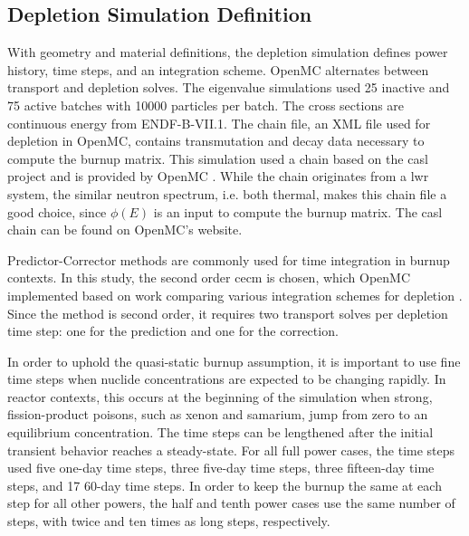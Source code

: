 \documentclass[letterpaper]{physor2024}
\begin{document}
\subsection{Depletion Simulation Definition}\label{sec:depl_sim}
With geometry and material definitions, the depletion simulation defines power history, time steps, and an integration scheme. OpenMC alternates between transport and depletion solves. The eigenvalue simulations used 25 inactive and 75 active batches with 10000 particles per batch. The cross sections are continuous energy from ENDF-B-VII.1. The chain file, an XML file used for depletion in OpenMC, contains transmutation and decay data necessary to compute the burnup matrix. This simulation used a chain based on the \gls{casl} project \cite{CASL-report} and is provided by OpenMC \cite{openmc-chains}. While the chain originates from a \gls{lwr} system, the similar neutron spectrum, i.e. both thermal, makes this chain file a good choice, since $\phi(E)$ is an input to compute the burnup matrix. The \gls{casl} chain can be found on OpenMC's website.

Predictor-Corrector methods are commonly used for time integration in burnup contexts. In this study, the second order \gls{cecm} is chosen, which OpenMC implemented based on work comparing various integration schemes for depletion \cite{isotalo_comparison_2015}. Since the method is second order, it requires two transport solves per depletion time step: one for the prediction and one for the correction.

In order to uphold the quasi-static burnup assumption, it is important to use fine time steps when nuclide concentrations are expected to be changing rapidly. In reactor contexts, this occurs at the beginning of the simulation when strong, fission-product poisons, such as xenon and samarium, jump from zero to an equilibrium concentration. The time steps can be lengthened after the initial transient behavior reaches a steady-state. For all full power cases, the time steps used five one-day time steps, three five-day time steps, three fifteen-day time steps, and 17 60-day time steps. In order to keep the burnup the same at each step for all other powers, the half and tenth power cases use the same number of steps, with twice and ten times as long steps, respectively.
\end{document}

